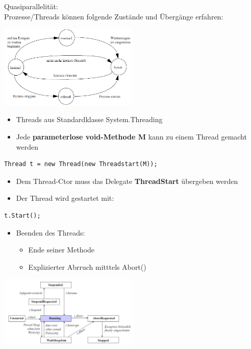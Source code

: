Quasiparallelität:\\
Prozesse/Threads können folgende Zustände und Übergänge erfahren: 
\begin{center}
{\includegraphics[width=0.5\textwidth]{images/Concurrency/Prozesszustaende.png}}
\end{center}

\begin{itemize}
  \item Threads aus Standardklasse System.Threading
  \item Jede \textbf{parameterlose void-Methode M} kann zu einem Thread gemacht
  werden 
\end{itemize}
\begin{centering}
  \begin{lstlisting}[style=C]
  Thread t = new Thread(new Threadstart(M));
  \end{lstlisting}
\end{centering}
\begin{itemize}
  \item Dem Thread-Ctor muss das Delegate \textbf{ThreadStart} übergeben werden
  \item Der Thread wird gestartet mit:  
\end{itemize}
\begin{centering}
  \begin{lstlisting}[style=C]
  t.Start();
  \end{lstlisting}
\end{centering}
\begin{itemize}
  \item Beenden des Threads: 
  \begin{itemize}
    \item Ende seiner Methode
    \item Explizierter Abrruch mitttels Abort()  
  \end{itemize} 
\end{itemize}
\begin{center}
{\includegraphics[width=0.5\textwidth]{images/Concurrency/Zustandsuebergaenge.png}}
\end{center}



